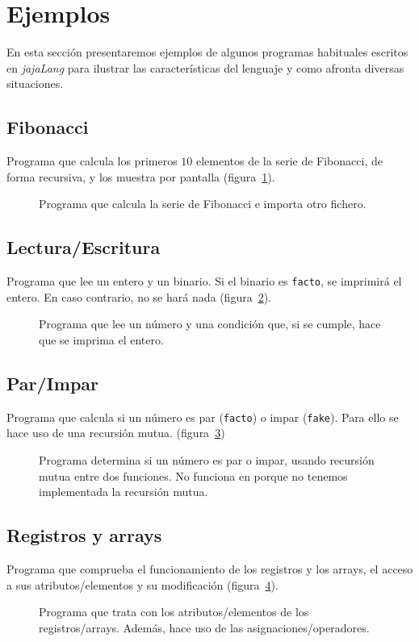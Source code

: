 \section{Ejemplos}
En esta sección presentaremos ejemplos de algunos programas habituales escritos
en \textit{jajaLang} para ilustrar las características del lenguaje y como
afronta diversas situaciones.

\subsection{Fibonacci}
Programa que calcula los primeros $10$ elementos de la serie de Fibonacci, de forma
recursiva, y los muestra por pantalla (figura~\ref{fig:fibo}).
\begin{figure}[htbp]
    \centering
    
    \caption{Programa que calcula la serie de Fibonacci e importa otro fichero.}
    \label{fig:fibo}
\end{figure}

\subsection{Lectura/Escritura}
Programa que lee un entero y un binario. Si el binario es \lstinline{facto}, se
imprimirá el entero. En caso contrario, no se hará nada
(figura~\ref{fig:lecesc}).
\begin{figure}[htbp]
    \centering
    
    \caption{Programa que lee un número y una condición que, si se cumple, hace
    que se imprima el entero.}
    \label{fig:lecesc}
\end{figure}

\subsection{Par/Impar}
Programa que calcula si un número es par (\lstinline{facto}) o impar
(\lstinline{fake}). Para ello se hace uso de una recursión mutua.
(figura~\ref{fig:parimpar})
\begin{figure}[htbp]
    \centering
    
    \caption{Programa determina si un número es par o impar, usando recursión
    mutua entre dos funciones. No funciona en porque no tenemos implementada la recursión mutua.}
    \label{fig:parimpar}
\end{figure}

\subsection{Registros y arrays}
Programa que comprueba el funcionamiento de los registros y los arrays, el
acceso a sus atributos/elementos y su modificación (figura~\ref{fig:regarray}).
\begin{figure}[htbp]
    \centering
    
    \caption{Programa que trata con los atributos/elementos de los
    registros/arrays. Además, hace uso de las asignaciones/operadores.}
    \label{fig:regarray}
\end{figure}

